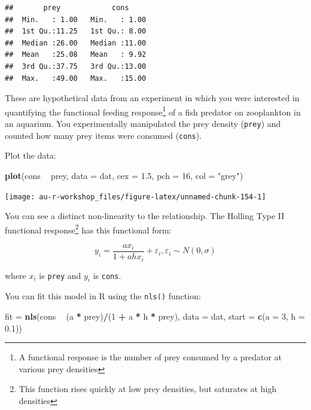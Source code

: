 \documentclass[]{book}
\newenvironment{Shaded}{\begin{snugshade}}{\end{snugshade}}
\newcommand{\KeywordTok}[1]{\textcolor[rgb]{0.13,0.29,0.53}{\textbf{#1}}}
\newcommand{\DataTypeTok}[1]{\textcolor[rgb]{0.13,0.29,0.53}{#1}}
\newcommand{\DecValTok}[1]{\textcolor[rgb]{0.00,0.00,0.81}{#1}}
\newcommand{\FloatTok}[1]{\textcolor[rgb]{0.00,0.00,0.81}{#1}}
\newcommand{\StringTok}[1]{\textcolor[rgb]{0.31,0.60,0.02}{#1}}
\newcommand{\OperatorTok}[1]{\textcolor[rgb]{0.81,0.36,0.00}{\textbf{#1}}}
\newcommand{\NormalTok}[1]{#1}
\let\rmarkdownfootnote\footnote%
\def\footnote{\protect\rmarkdownfootnote}
\theoremstyle{definition}
\theoremstyle{definition}
\theoremstyle{definition}
\theoremstyle{remark}
\begin{document}
\begin{verbatim}
##       prey            cons      
##  Min.   : 1.00   Min.   : 1.00  
##  1st Qu.:11.25   1st Qu.: 8.00  
##  Median :26.00   Median :11.00  
##  Mean   :25.08   Mean   : 9.92  
##  3rd Qu.:37.75   3rd Qu.:13.00  
##  Max.   :49.00   Max.   :15.00
\end{verbatim}

These are hypothetical data from an experiment in which you were
interested in quantifying the functional feeding response\footnote{A
  functional response is the number of prey consumed by a predator at
  various prey densities} of a fish predator on zooplankton in an
aquarium. You experimentally manipulated the prey density
(\texttt{prey}) and counted how many prey items were consumed
(\texttt{cons}).

Plot the data:

\begin{Shaded}
\begin{Highlighting}[]
\KeywordTok{plot}\NormalTok{(cons }\OperatorTok{~}\StringTok{ }\NormalTok{prey, }\DataTypeTok{data =}\NormalTok{ dat, }\DataTypeTok{cex =} \FloatTok{1.5}\NormalTok{, }\DataTypeTok{pch =} \DecValTok{16}\NormalTok{, }\DataTypeTok{col =} \StringTok{"grey"}\NormalTok{)}
\end{Highlighting}
\end{Shaded}

\begin{center}\texttt{[image: au-r-workshop\_files/figure-latex/unnamed-chunk-154-1]} \end{center}

You can see a distinct non-linearity to the relationship. The Holling
Type II functional response\footnote{This function rises quickly at low
  prey densities, but saturates at high densities} has this functional
form:

\begin{equation}
  y_i=\frac{ax_i}{1+ahx_i} + \varepsilon_i, \varepsilon_i \sim N(0, \sigma)
\label{eq:func-resp}
\end{equation}

where \(x_i\) is \texttt{prey} and \(y_i\) is \texttt{cons}.

You can fit this model in R using the \texttt{nls()} function:

\begin{Shaded}
\begin{Highlighting}[]
\NormalTok{fit =}\StringTok{ }\KeywordTok{nls}\NormalTok{(cons }\OperatorTok{~}\StringTok{ }\NormalTok{(a }\OperatorTok{*}\StringTok{ }\NormalTok{prey)}\OperatorTok{/}\NormalTok{(}\DecValTok{1} \OperatorTok{+}\StringTok{ }\NormalTok{a }\OperatorTok{*}\StringTok{ }\NormalTok{h }\OperatorTok{*}\StringTok{ }\NormalTok{prey), }\DataTypeTok{data =}\NormalTok{ dat,}
          \DataTypeTok{start =} \KeywordTok{c}\NormalTok{(}\DataTypeTok{a =} \DecValTok{3}\NormalTok{, }\DataTypeTok{h =} \FloatTok{0.1}\NormalTok{))}
\end{Highlighting}
\end{Shaded}
\end{document}
